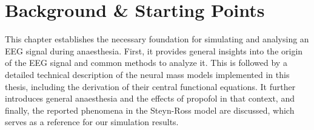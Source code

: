 
\chapter{Background \& Starting Points}\label{ch:theoretical-concepts} %
This chapter establishes the necessary foundation for simulating and analysing an EEG signal during anaesthesia.
First, it provides general insights into the origin of the EEG signal and common methods to analyze it.
This is followed by a detailed technical description of the neural mass models implemented in this thesis,
including the derivation of their central functional equations.
It further introduces general anaesthesia and the effects of propofol in that context,
and finally, the reported phenomena in the Steyn-Ross model are discussed,
which serves as a reference for our simulation results.
%


\pagebreak

\pagebreak

\pagebreak
%
